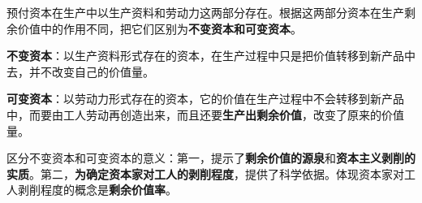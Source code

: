 预付资本在生产中以生产资料和劳动力这两部分存在。根据这两部分资本在生产剩余价值中的作用不同，把它们区别为\textbf{不变资本和可变资本}。

\textbf{不变资本}：以生产资料形式存在的资本，在生产过程中只是把价值转移到新产品中去，并不改变自己的价值量。

\textbf{可变资本}：以劳动力形式存在的资本，它的价值在生产过程中不会转移到新产品中，而要由工人劳动再创造出来，而且还要\textbf{生产出剩余价值}，改变了原来的价值量。

{区分不变资本和可变资本的意义：第一，提示了}\textbf{剩余价值的源泉}{和}\textbf{资本主义剥削的实质}{。第二，}\textbf{为确定资本家对工人的剥削程度}{，提供了科学依据。体现资本家对工人剥削程度的概念是}\textbf{剩余价值率}{。}
